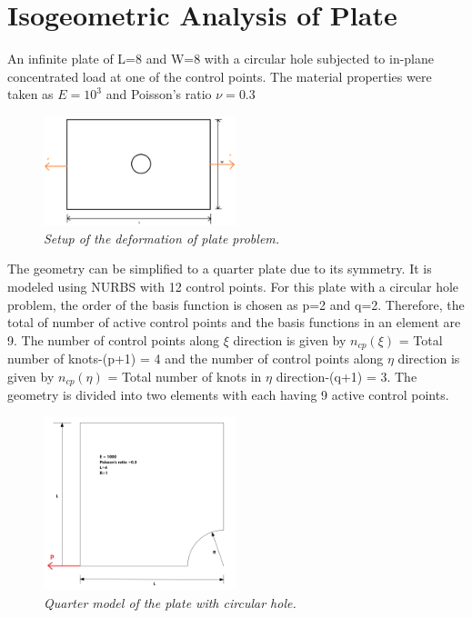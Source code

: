 \documentclass[submit,12pt]{aiaa-pretty} %
\begin{document}
\section{Isogeometric Analysis of Plate}
An infinite plate of L=8 and W=8 with a circular hole subjected to in-plane concentrated load at one of the control points. The material properties were taken as $E = 10^3$ and Poisson's ratio $\nu =0.3$
\begin{figure}[h] 
  \centering
  \includegraphics[width=0.5\textwidth]{figures/plate1.PNG} 
  \caption{\emph{Setup of the deformation of plate problem.}}
  \label{fig:plate-setup}
\end{figure}
The geometry can be simplified to a quarter plate due to its symmetry. It is modeled using NURBS with 12 control points. For this plate with a circular hole problem, the order of the basis function is chosen as p=2 and q=2. Therefore, the total of number of active control points and the basis functions in an element are 9. The number of control points along $\xi$ direction is given by $n_{cp}(\xi)$ = Total number of knots-(p+1) = 4 and the number of control points along $\eta$ direction is given by $n_{cp}(\eta)$ = Total number of knots in $\eta$ direction-(q+1) = 3. The geometry is divided into two elements with each having 9 active control points. 
\begin{figure}[h] 
  \centering
  \includegraphics[width=0.5\textwidth]{figures/plate2.png} 
  \caption{\emph{Quarter model of the plate with circular hole.}}
  \label{fig:plate-setup}
\end{figure}
\end{document}
